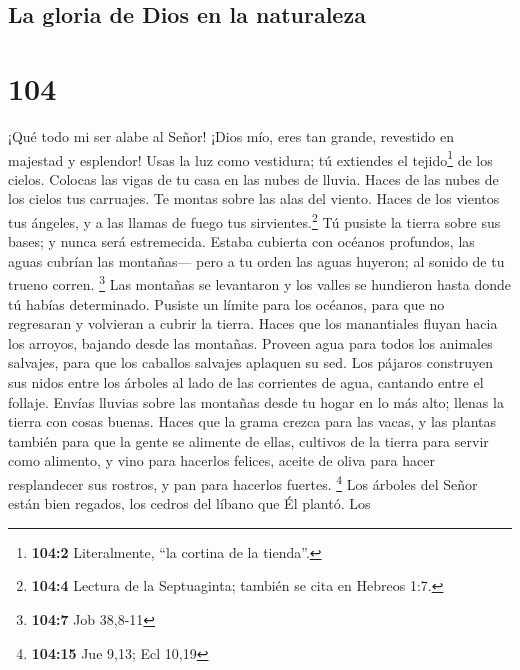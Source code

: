 \hypertarget{la-gloria-de-dios-en-la-naturaleza}{%
\subsection{La gloria de Dios en la
naturaleza}\label{la-gloria-de-dios-en-la-naturaleza}}

\hypertarget{section-103}{%
\section{104}\label{section-103}}

 ¡Qué todo mi ser alabe al Señor! ¡Dios mío, eres tan
grande, revestido en majestad y esplendor!  Usas la luz
como vestidura; tú extiendes el tejido\footnote{\textbf{104:2}
  Literalmente, ``la cortina de la tienda''.} de los cielos.
 Colocas las vigas de tu casa en las nubes de lluvia.
Haces de las nubes de los cielos tus carruajes. Te montas sobre las alas
del viento.  Haces de los vientos tus ángeles, y a las
llamas de fuego tus sirvientes.\footnote{\textbf{104:4} Lectura de la
  Septuaginta; también se cita en Hebreos 1:7.}  Tú
pusiste la tierra sobre sus bases; y nunca será estremecida.
 Estaba cubierta con océanos profundos, las aguas cubrían
las montañas---  pero a tu orden las aguas huyeron; al
sonido de tu trueno corren. \footnote{\textbf{104:7} Job 38,8-11}
 Las montañas se levantaron y los valles se hundieron
hasta donde tú habías determinado.  Pusiste un límite para
los océanos, para que no regresaran y volvieran a cubrir la tierra.
 Haces que los manantiales fluyan hacia los arroyos,
bajando desde las montañas.  Proveen agua para todos los
animales salvajes, para que los caballos salvajes aplaquen su sed.
 Los pájaros construyen sus nidos entre los árboles al
lado de las corrientes de agua, cantando entre el follaje.
 Envías lluvias sobre las montañas desde tu hogar en lo
más alto; llenas la tierra con cosas buenas.  Haces que
la grama crezca para las vacas, y las plantas también para que la gente
se alimente de ellas, cultivos de la tierra para servir como alimento,
 y vino para hacerlos felices, aceite de oliva para hacer
resplandecer sus rostros, y pan para hacerlos fuertes. \footnote{\textbf{104:15}
  Jue 9,13; Ecl 10,19}  Los árboles del Señor están bien
regados, los cedros del líbano que Él plantó.  Los
